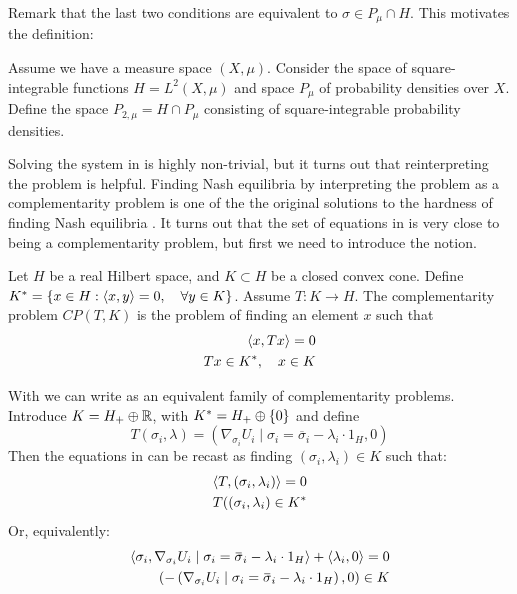 Remark that the last two conditions are equivalent to $\sigma \in P_{\mu} \cap H$. This motivates the definition:
\begin{definition}
  Assume we have a measure space $(X,\mu)$. Consider the space of square-integrable functions $H=L^2(X,\mu)$ and space $P_{\mu}$ of probability densities over $X$. Define the space $P_{2,\mu}=H \cap P_{\mu}$ consisting of square-integrable probability densities.
\end{definition}
Solving the system in  is highly non-trivial, but it turns out that reinterpreting the problem is helpful.
Finding Nash equilibria by interpreting the problem as a complementarity problem is one of the the original solutions to the hardness of finding Nash equilibria  \citep{karamardian1969nonlinear}. It turns out that the set of equations in  is very close to being a complementarity problem, but first we need to introduce the notion.
\begin{definition}
  \label{def:comp_prob}
  Let $H$ be a real Hilbert space, and $K \subset H$ be a closed convex cone. Define $K^* = \{ x \in H : \left \langle x,y \right \rangle = 0, \quad \forall y\in K\} $. Assume $T:K \to H$. The complementarity problem $CP(T,K)$ is the problem of finding an element $x$ such that
  \begin{equation}
    \begin{split}
    \left \langle x,Tx \right \rangle = 0 \\
    Tx \in K^*, \quad  x\in K
  \end{split}
  \end{equation}
\end{definition}
With  we can write  as an equivalent family of complementarity problems. Introduce $K = H_+ \oplus \mathbb{R}$, with $K^* = H_+ \oplus \{0\}$ and define
\begin{equation}
  T(\sigma_i, \lambda) = (\nabla_{\sigma_i} U_i \mid{\sigma_i = \overbar{\sigma}_i} - \lambda_i \cdot 1_H, 0)
\end{equation}
Then the equations in  can be recast as finding $(\sigma_i,\lambda_i) \in K$ such that:
\begin{equation}
  \label{eq:comp_form}
  \begin{split}
    \left \langle T,(\sigma_i,\lambda_i) \right \rangle = 0 \\
    T((\sigma_i,\lambda_i) \in K^*
  \end{split}
\end{equation}
Or, equivalently:
\begin{equation}
  \begin{split}
    \ip{\sigma_i}{\nabla_{\sigma_i} U_i \mid{\sigma_i = \overbar{\sigma}_i} - \lambda_i \cdot 1_H} + \ip{\lambda_i}{0}= 0 \\
    \pa{-\pa{\nabla_{\sigma_i} U_i \mid{\sigma_i = \overbar{\sigma}_i} - \lambda_i \cdot 1_H}, 0} \in K
  \end{split}
\end{equation}
